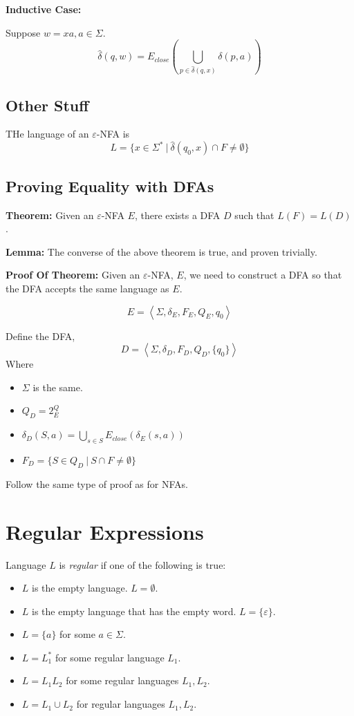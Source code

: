 \documentclass[12pt]{article}
\begin{document}
\textbf{Inductive Case:}

Suppose $w = xa, a \in \Sigma$.
\[
\hat{\delta}(q,w) = E_{close}\left(\bigcup_{p \in \hat{\delta}(q,x)}
\delta(p,a)\right)
\]

\subsection{Other Stuff}

THe language of an $\varepsilon$-NFA is
\[
L = \{ x \in \Sigma^*\ |\ \hat{\delta}(q_0,x) \cap F \neq \emptyset\}
\]

\subsection{Proving Equality with DFAs}

\textbf{Theorem:} Given an $\varepsilon$-NFA $E$, there exists a DFA $D$ such
that $L(F) = L(D)$.

\textbf{Lemma:} The converse of the above theorem is true, and proven trivially.

\textbf{Proof Of Theorem:} Given an $\varepsilon$-NFA, $E$, we need to construct a
DFA so that the DFA accepts the same language as $E$.

\[
E = \left< \Sigma, \delta_E, F_E, Q_E, q_0 \right>
\]

Define the DFA,
\[
D = \left< \Sigma, \delta_D , F_D ,Q_D, \{q_0\} \right>
\]
Where
\begin{itemize}
    \item $\Sigma$ is the same.
    \item $Q_D = 2^Q_E$
    \item $\delta_D(S,a) = \bigcup_{s \in S} E_{close}(\delta_E(s,a))$
    \item $F_D =  \{ S \in Q_D\ |\ S \cap F \neq \emptyset \}$
\end{itemize}

Follow the same type of proof as for NFAs.

\section{Regular Expressions}

Language $L$ is \textit{regular} if one of the following is true:
\begin{itemize}
    \item $L$ is the empty language. $L = \emptyset$.
    \item $L$ is the empty language that has the empty word. $L =
        \{\varepsilon\}$.
    \item $L = \{a\}$ for some $a \in \Sigma$.
    \item $L = L_1^*$ for some regular language $L_1$.
    \item $L = L_1L_2$ for some regular languages $L_1,L_2$.
    \item $L = L_1 \cup L_2$ for regular languages $L_1,L_2$.
\end{itemize}
\end{document}
